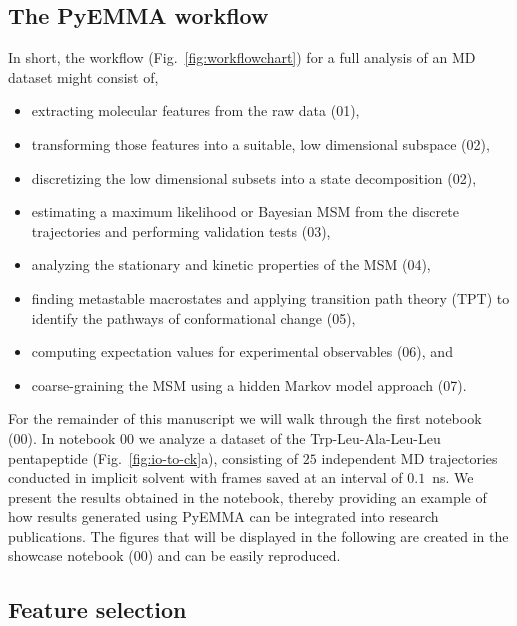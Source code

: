 \documentclass[9pt,tutorial]{livecoms}
\begin{document}
\subsection{The PyEMMA workflow}

In short, the workflow (Fig.~\ref{fig:workflowchart}) for a full analysis of an MD dataset might consist of,
\begin{itemize}
	\item extracting molecular features from the raw data (01),
	\item transforming those features into a suitable, low dimensional subspace (02),
	\item discretizing the low dimensional subsets into a state decomposition (02),
	\item estimating a maximum likelihood or Bayesian MSM from the discrete trajectories and performing validation tests (03),
	\item analyzing the stationary and kinetic properties of the MSM (04),
	\item finding metastable macrostates and applying transition path theory (TPT) to identify the pathways of conformational change (05),
	\item computing expectation values for experimental observables (06), and
	\item coarse-graining the MSM using a hidden Markov model approach (07).
\end{itemize}

For the remainder of this manuscript we will walk through the first notebook (00). In notebook 00 we analyze a dataset of the Trp-Leu-Ala-Leu-Leu pentapeptide (Fig.~\ref{fig:io-to-ck}a), consisting of $25$ independent MD trajectories conducted in implicit solvent with frames saved at an interval of $0.1$~ns. We present the results obtained in the notebook, thereby providing an example of how results generated using PyEMMA can be integrated into research publications.
The figures that will be displayed in the following are created in the showcase notebook (00) and can be easily reproduced.

\subsection{Feature selection}
\end{document}

